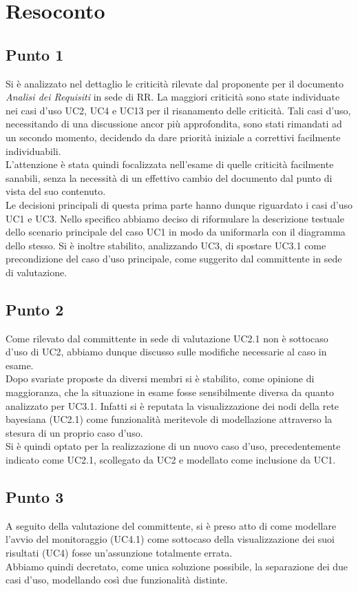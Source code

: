 \section{Resoconto}

\subsection{Punto 1}
Si è analizzato nel dettaglio le criticità rilevate dal proponente per il documento \textit{Analisi dei Requisiti} in sede di RR. La maggiori criticità sono state individuate nei casi d'uso UC2, UC4 e UC13 per il risanamento delle criticità. Tali casi d'uso, necessitando di una discussione ancor più approfondita, sono stati rimandati ad un secondo momento, decidendo da dare priorità iniziale a correttivi facilmente individuabili.\\
L'attenzione  è stata quindi focalizzata nell'esame di quelle criticità facilmente sanabili, senza la necessità di un effettivo cambio del documento dal punto di vista del suo contenuto.\\
Le decisioni principali di questa prima parte hanno dunque riguardato i casi d'uso UC1 e UC3. Nello specifico abbiamo deciso di riformulare la descrizione testuale dello scenario principale del caso UC1 in modo da uniformarla con il diagramma dello stesso. Si è inoltre stabilito, analizzando UC3, di spostare UC3.1 come precondizione del caso d'uso principale, come suggerito dal committente in sede di valutazione.

\subsection{Punto 2}
Come rilevato dal committente in sede di valutazione UC2.1 non è sottocaso d'uso di UC2, abbiamo dunque discusso sulle modifiche necessarie al caso in esame.\\
Dopo svariate proposte da diversi membri si è stabilito, come opinione di maggioranza, che la situazione in esame fosse sensibilmente diversa da quanto analizzato per UC3.1. Infatti si è reputata la visualizzazione dei nodi della rete bayesiana (UC2.1) come funzionalità meritevole di modellazione attraverso la stesura di un proprio caso d'uso.\\
Si è quindi optato per la realizzazione di un nuovo caso d'uso, precedentemente indicato come UC2.1, scollegato da UC2 e modellato come inclusione da UC1.

\subsection{Punto 3}
A seguito della valutazione del committente, si è preso atto di come modellare l'avvio del monitoraggio (UC4.1) come sottocaso della visualizzazione dei suoi risultati (UC4) fosse un'assunzione totalmente errata.\\
Abbiamo quindi decretato, come unica soluzione possibile, la separazione dei due casi d'uso, modellando così due funzionalità distinte.

